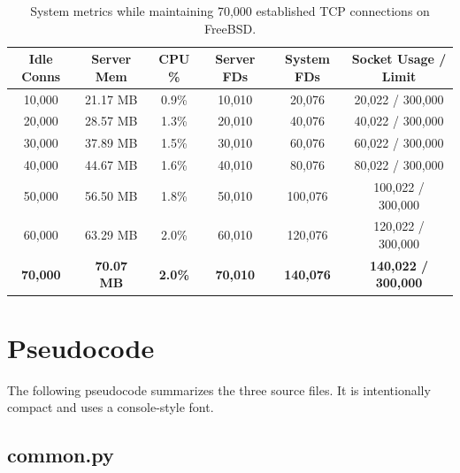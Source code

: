 \documentclass[11pt,a4paper]{article}
\begin{document}
\begin{table}[H]
\centering
\begin{tabular}{|c|c|c|c|c|c|}
\hline
\textbf{Idle Conns} & \textbf{Server Mem} & \textbf{CPU \%} & \textbf{Server FDs} & \textbf{System FDs} & \textbf{Socket Usage / Limit} \\ \hline
10,000  & 21.17 MB & 0.9\% & 10,010 & 20,076 & 20,022 / 300,000 \\ \hline
20,000  & 28.57 MB & 1.3\% & 20,010 & 40,076 & 40,022 / 300,000 \\ \hline
30,000  & 37.89 MB & 1.5\% & 30,010 & 60,076 & 60,022 / 300,000 \\ \hline
40,000  & 44.67 MB & 1.6\% & 40,010 & 80,076 & 80,022 / 300,000 \\ \hline
50,000  & 56.50 MB & 1.8\% & 50,010 & 100,076 & 100,022 / 300,000 \\ \hline
60,000  & 63.29 MB & 2.0\% & 60,010 & 120,076 & 120,022 / 300,000 \\ \hline
\textbf{70,000} & \textbf{70.07 MB} & \textbf{2.0\%} & \textbf{70,010} & \textbf{140,076} & \textbf{140,022 / 300,000} \\ \hline
\end{tabular}
\caption{System metrics while maintaining 70,000 established TCP connections on FreeBSD.}
\label{tab:connections}
\end{table}

\section{Pseudocode}

The following pseudocode summarizes the three source files. It is intentionally
compact and uses a console-style font.


\subsection{{common.py}}
\end{document}
